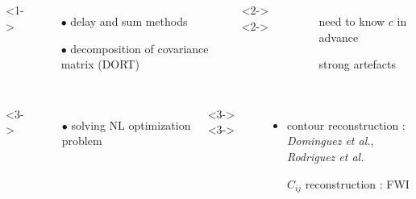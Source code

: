 \documentclass[10pt,xcolor=x11names,compress, notes=show]{beamer}%
\begin{document}
\begin{frame}{\insertsectionhead}
\begin{columns}[c]
	\end{columns}
	\vspace{0.3cm}
	\begin{columns}[c]
			<1->
				\begin{itemize}
					\item[$\bullet$] delay and sum methods
					\item[$\bullet$] decomposition of covariance matrix (DORT)
				\end{itemize}
			<2->
			<2->
				\begin{itemize}
					\item[\ding{55}] need to know $c$ in advance\\
					\item[\ding{55}] strong artefacts
				\end{itemize}
			
	\end{columns}
	\begin{columns}[c]
		<3->
			\begin{itemize}
				\item[$\bullet$] solving NL optimization problem
			\end{itemize}
		<3->
		<3->
			\begin{itemize}
			\item contour reconstruction :\\\hspace{-0.5cm}\small{\emph{Dominguez et al.}, \emph{Rodriguez et al.}}\\[0.1cm]
			\item[\ding{51}] \normalsize{$C_{ij}$ reconstruction : FWI}
		\end{itemize}		
	\end{columns}
\end{frame} 
\end{document}
